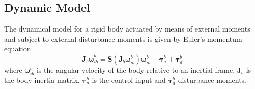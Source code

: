 \subsection{Dynamic Model}
The dynamical model for a rigid body actuated by means of external moments and subject to external disturbance moments is given by Euler’s momentum equation
\begin{equation}
    \mathbf{J}_b\dot{\boldsymbol{\omega}}^{b}_{ib}=\mathbf{S}\left (\mathbf{J}_b\boldsymbol{\omega}^b_{ib}\right )\boldsymbol{\omega}^b_{ib}+\boldsymbol{\tau}^b_a+\boldsymbol{\tau}^b_d
\end{equation}
where $\boldsymbol{\omega}^b_{ib}$ is the angular velocity of the body relative to an inertial frame, $\mathbf{J}_b$ is the body inertia matrix, $\boldsymbol{\tau}^b_a$ is the control input and $\boldsymbol{\tau}^b_d$ disturbance moments.

